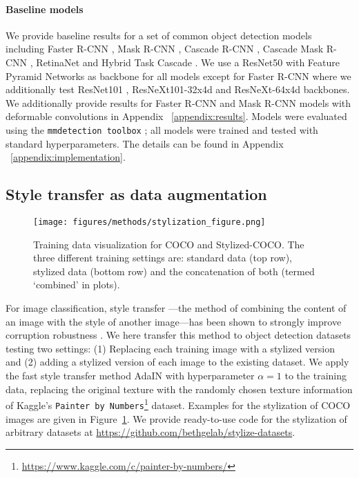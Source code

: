 \documentclass{article}
\begin{document}
\paragraph{Baseline models}
We provide baseline results for a set of common object detection models including Faster R-CNN \citep{Ren2015}, Mask R-CNN \citep{He2017}, Cascade R-CNN \citep{Cai18cascadercnn}, Cascade Mask R-CNN \citep{Chen2019hybrid}, RetinaNet \citep{Lin2017b} and Hybrid Task Cascade \citep{Chen2019hybrid}. We use a ResNet50 \citep{He2016} with Feature Pyramid Networks \citep{Lin2017} as backbone for all models except for Faster R-CNN where we additionally test ResNet101 \citep{He2016}, ResNeXt101-32x4d \citep{Xie2017resnext} and ResNeXt-64x4d \citep{Xie2017resnext} backbones. We additionally provide results for Faster R-CNN and Mask R-CNN models with deformable convolutions \citep{dai2017deformable, zhu2018deformable} in Appendix ~\ref{appendix:results}. Models were evaluated using the \texttt{mmdetection toolbox} \citep{mmdetection}; all models were trained and tested with standard hyperparameters. The details can be found in Appendix ~\ref{appendix:implementation}.

\subsection{Style transfer as data augmentation}

\begin{figure}[t]
    \centering
    \texttt{[image: figures/methods/stylization\_figure.png]}
    \caption{Training data visualization for COCO and Stylized-COCO. The three different training settings are: standard data (top row), stylized data (bottom row) and the concatenation of both (termed `combined' in plots).}
    \label{fig:stylization}
    \vspace{-0.2cm}
\end{figure}

For image classification, style transfer \citep{gatys2016image}---the method of combining the content of an image with the style of another image---has been shown to strongly improve corruption robustness \citep{geirhos2019imagenettrained}. We here transfer this method to object detection datasets testing two settings: (1) Replacing each training image with a stylized version and (2) adding a stylized version of each image to the existing dataset. We apply the fast style transfer method AdaIN \citep{huang2017arbitrary} with hyperparameter \texttt{$\alpha = 1$} to the training data, replacing the original texture with the randomly chosen texture information of Kaggle's \texttt{Painter by Numbers}\footnote{\url{https://www.kaggle.com/c/painter-by-numbers/}} dataset. Examples for the stylization of COCO images are given in Figure~\ref{fig:stylization}. We provide ready-to-use code for the stylization of arbitrary datasets at \url{https://github.com/bethgelab/stylize-datasets}.
\end{document}

